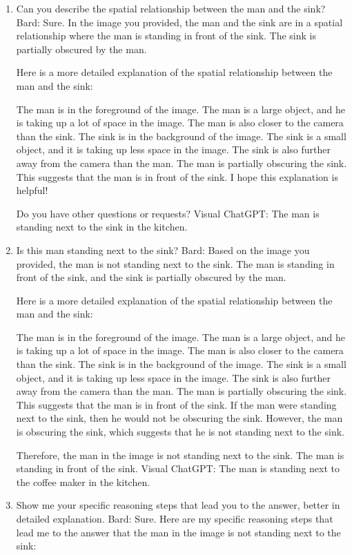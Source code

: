 \begin{enumerate}
    \item Can you describe the spatial relationship between the man and the sink?
    \subitem Bard: 
    Sure. In the image you provided, the man and the sink are in a spatial relationship where the man is standing in front of the sink. The sink is partially obscured by the man.
    
    Here is a more detailed explanation of the spatial relationship between the man and the sink:
    
    The man is in the foreground of the image. The man is a large object, and he is taking up a lot of space in the image. The man is also closer to the camera than the sink.
    The sink is in the background of the image. The sink is a small object, and it is taking up less space in the image. The sink is also further away from the camera than the man.
    The man is partially obscuring the sink. This suggests that the man is in front of the sink.
    I hope this explanation is helpful!
    
    Do you have other questions or requests?
    \subitem Visual ChatGPT: The man is standing next to the sink in the kitchen.
    \item Is this man standing next to the sink?
    \subitem Bard: 
    Based on the image you provided, the man is not standing next to the sink. The man is standing in front of the sink, and the sink is partially obscured by the man.
    
    Here is a more detailed explanation of the spatial relationship between the man and the sink:
    
    The man is in the foreground of the image. The man is a large object, and he is taking up a lot of space in the image. The man is also closer to the camera than the sink.
    The sink is in the background of the image. The sink is a small object, and it is taking up less space in the image. The sink is also further away from the camera than the man.
    The man is partially obscuring the sink. This suggests that the man is in front of the sink.
    If the man were standing next to the sink, then he would not be obscuring the sink. However, the man is obscuring the sink, which suggests that he is not standing next to the sink.
    
    Therefore, the man in the image is not standing next to the sink. The man is standing in front of the sink.
    \subitem Visual ChatGPT: The man is standing next to the coffee maker in the kitchen.
    \item Show me your specific reasoning steps that lead you to the answer, better in detailed explanation.
    \subitem Bard: 
    Sure. Here are my specific reasoning steps that lead me to the answer that the man in the image is not standing next to the sink:
    

\end{enumerate}

